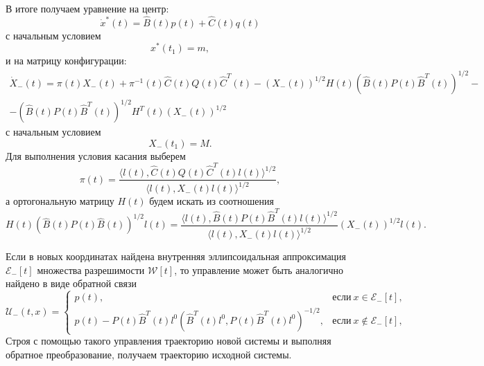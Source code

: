 В итоге получаем уравнение на центр:
\begin{equation*}\label{A_dif_center}
    \dot{x}^*(t) = \hat{B}(t) p(t) + \hat{C}(t) q(t)
\end{equation*}
с начальным условием
\begin{equation*}\label{A_dif_center_bound}
    x^*(t_1) = m,
\end{equation*}
и на матрицу конфигурации:
\begin{gather*}\label{A_dif_matrix}
    \dot{X}_-(t) = \pi(t) X_-(t) + \pi^{-1}(t) \hat{C}(t) Q(t) \hat{C}^T(t) - (X_-(t))^{1/2} H(t) (\hat{B}(t) P(t) \hat{B}^T(t))^{1/2} - \\
     - (\hat{B}(t) P(t) \hat{B}^T(t))^{1/2} H^T(t) (X_-(t))^{1/2}
\end{gather*}
с начальным условием
\begin{equation*}\label{A_dif_matr_bound}
    X_-(t_1) = M.
\end{equation*}
Для выполнения условия касания выберем
\begin{equation*}
    \pi(t) = \frac{\langle l(t), \hat{C}(t) Q(t) \hat{C}^T(t) l(t) \rangle^{1/2}}{\langle l(t), X_-(t) l(t) \rangle^{1/2}},
\end{equation*}
а ортогональную матрицу \( H(t) \) будем искать из соотношения
\begin{equation*}
    H(t)(\hat{B}(t) P(t) \hat{B}(t))^{1/2} l(t) = \frac{\langle l(t), \hat{B}(t) P(t) \hat{B}^T(t) l(t) \rangle^{1/2}}{\langle l(t), X_-(t) l(t) \rangle^{1/2}} (X_-(t))^{1/2} l(t).
\end{equation*}

Если в новых координатах найдена внутренняя эллипсоидальная аппроксимация \( \mathcal{E}_-[t] \) множества разрешимости \( \mathcal{W}[t] \), то
управление может быть аналогично найдено в виде обратной связи
\begin{equation*}
    \mathcal{U}_-(t,x) = 
     \begin{cases}
        p(t), & \text{если} \ x \in \mathcal{E}_-[t], \\
        p(t) - P(t)\hat{B}^T(t)l^0(\hat{B}^T(t)l^0, P(t)\hat{B}^T(t)l^0)^{-1/2}, & \text{если} \ x \notin \mathcal{E}_-[t],
     \end{cases}
\end{equation*}
Строя с помощью такого управления траекторию новой системы и выполняя обратное преобразование, получаем 
траекторию исходной системы.